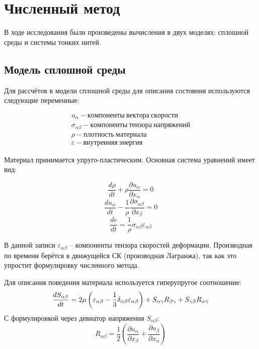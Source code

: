 \chapter{Численный метод}\label{ch:numeric}
В ходе исследования были произведены вычисления в двух моделях: сплошной среды и системы тонких нитей.

\section*{Модель сплошной среды}
Для рассчётов в модели сплошной среды для описания состояния используются следующие переменные:

\begin{gather*}
    u_{\alpha} - компоненты~вектора~скорости \\
    \sigma_{\alpha\beta} - компоненты~тензора~напряжений \\
    \rho - плотность~материала \\
    \varepsilon - внутренняя~энергия
\end{gather*}

Материал принимается упруго-пластическим.
Основная система уравнений имеет вид:

\begin{equation}
    \frac{d\rho}{dt} + \rho \frac{\partial u_{\alpha}}{\partial x_{\alpha}} = 0
\end{equation}
\begin{equation}
    \frac{d u_{\alpha}}{dt} - \frac{1}{\rho} \frac{\partial \sigma_{\alpha \beta}}{\partial x_{\beta}} = 0
\end{equation}
\begin{equation}
    \frac{de}{dt} = \frac{1}{\rho} \sigma_{\alpha \beta} \varepsilon_{\alpha \beta}
\end{equation}

В данной записи $\varepsilon_{\alpha \beta}$ -- компоненты тензора скоростей деформации.
Производная по времени берётся в движущейся СК (производная Лагранжа), так как это упростит формулировку численного метода.

Для описания поведения материала используется гиперупругое соотношение:
\begin{equation}
    \frac{d S_{\alpha \beta}}{d t} = 2 \mu \left( \varepsilon_{\alpha \beta} - \\
    \frac{1}{3} \delta_{\alpha \beta} \varepsilon_{\alpha \beta} \right) + S_{\alpha \gamma} R_{\beta \gamma} + \\
    S_{\gamma \beta} R_{\alpha \gamma}
\end{equation}
С формулировкой через девиатор напряжения $S_{\alpha\beta}$:
\begin{equation}
    R_{\alpha \beta} = \frac{1}{2} \left( \frac{\partial u_{\alpha}}{\partial x_{\beta}} + \frac{\partial u_{\beta}}{\partial x_{\alpha}} \right)
\end{equation}

